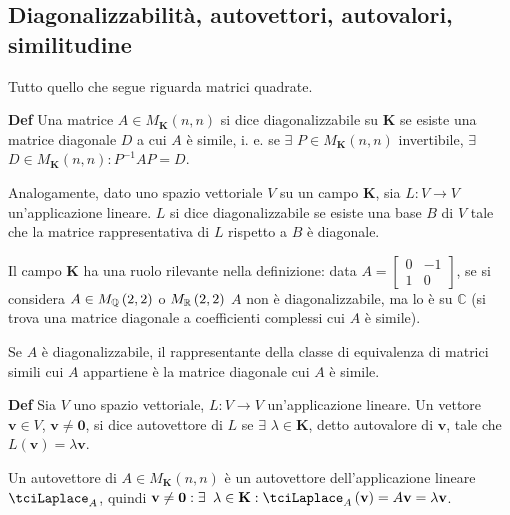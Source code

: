 \documentclass{article}
\begin{document}
\subsection{Diagonalizzabilit\`{a}, autovettori, autovalori, similitudine}

Tutto quello che segue riguarda matrici quadrate.

\textbf{Def} Una matrice $A\in M_{\mathbf{K}}\left( n,n\right) $ si dice
diagonalizzabile su $\mathbf{K}$ se esiste una matrice diagonale $D$ a cui $%
A $ \`{e} simile, i. e. se $\exists $ $P\in M_{\mathbf{K}}\left( n,n\right) $
invertibile, $\exists $ $D\in M_{\mathbf{K}}\left( n,n\right) :P^{-1}AP=D$.

Analogamente, dato uno spazio vettoriale $V$ su un campo $\mathbf{K}$, sia $%
L:V\rightarrow V$ un'applicazione lineare. $L$ si dice diagonalizzabile se
esiste una base $B$ di $V$ tale che la matrice rappresentativa di $L$
rispetto a $B$ \`{e} diagonale.

Il campo $\mathbf{K}$ ha una ruolo rilevante nella definizione: data $A=%
\left[ 
\begin{array}{cc}
0 & -1 \\ 
1 & 0%
\end{array}%
\right] $, se si considera $A\in M_{\mathbf{%
\mathbb{Q}
}}\left( 2,2\right) $ o $M_{%
\mathbb{R}
}\left( 2,2\right) $ $A$ non \`{e} diagonalizzabile, ma lo \`{e} su $%
\mathbb{C}
$ (si trova una matrice diagonale a coefficienti complessi cui $A$ \`{e}
simile).

Se $A$ \`{e} diagonalizzabile, il rappresentante della classe di equivalenza
di matrici simili cui $A$ appartiene \`{e} la matrice diagonale cui $A$ \`{e}
simile.

\textbf{Def} Sia $V$ uno spazio vettoriale, $L:V\rightarrow V$
un'applicazione lineare. Un vettore $\mathbf{v}\in V$, $\mathbf{v\neq 0}$,
si dice autovettore di $L$ se $\exists $ $\lambda \in \mathbf{K}$, detto
autovalore di $\mathbf{v}$, tale che $L\left( \mathbf{v}\right) =\lambda 
\mathbf{v}$.

Un autovettore di $A\in M_{\mathbf{K}}\left( n,n\right) $ \`{e} un
autovettore dell'applicazione lineare $\tciLaplace _{A}$, quindi $\mathbf{%
v\neq 0}:\exists $ $\lambda \in \mathbf{K}:\tciLaplace _{A}\left( \mathbf{v}%
\right) =A\mathbf{v}=\lambda \mathbf{v}$.
\end{document}
